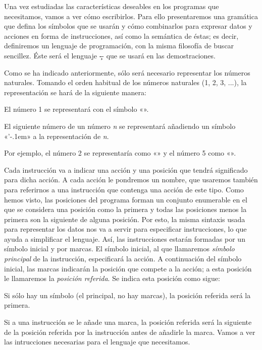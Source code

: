 Una vez estudiadas las características deseables en los programas que necesitamos, vamos a ver cómo
escribirlos. Para ello presentaremos una gramática que defina los símbolos que se usarán y cómo
combinarlos para expresar datos y acciones en forma de instrucciones, así como la semántica de
éstas; es decir, definiremos un lenguaje de programación, con la misma filosofía de buscar
sencillez. Éste será el lenguaje \c-- que se usará en las demostraciones.

Como se ha indicado anteriormente, sólo será necesario representar los números
naturales. Tomando el orden habitual de los números naturales (1, 2, 3, ...), la representación
se hará de la siguiente manera:

\listanormal
El número 1 se representará con el símbolo «{}».

El siguiente número de un número {\it n} se representará añadiendo un símbolo «{\fcodej’\kern-.1em}» a la
representación de {\it n}.

\finlista
Por ejemplo, el número 2 se representaría como «» y el número 5 como «».

Cada instrucción va a indicar una acción y una posición que tendrá significado para dicha acción. A
cada acción le pondremos un nombre, que usaremos también para referirnos a una instrucción que
contenga una acción de este tipo. Como hemos visto, las posiciones del programa forman un conjunto
enumerable en el que se considera una posición como la primera y todas las posiciones menos la
primera son la siguiente de alguna posición. Por esto, la misma sintaxis usada para representar los
datos nos va a servir para especificar instrucciones, lo que ayuda a simplificar el lenguaje. Así,
las instrucciones estarán formadas por un símbolo inicial y por marcas.  El símbolo inicial, al que
llamaremos {\it símbolo principal} de la instrucción, especificará la acción. A continuación del
símbolo inicial, las marcas indicarán la posición que compete a la acción; a esta posición le
llamaremos la {\it posición referida}. Se indica esta posición como sigue:

\listanormal
Si sólo hay un símbolo (el principal, no hay marcas), la posición referida será la primera.

Si a una instrucción se le añade una marca, la posición referida será la siguiente de la posición
referida por la instrucción antes de añadirle la marca.
\finlista
Vamos a ver las intrucciones necesarias para el lenguaje que necesitamos.

